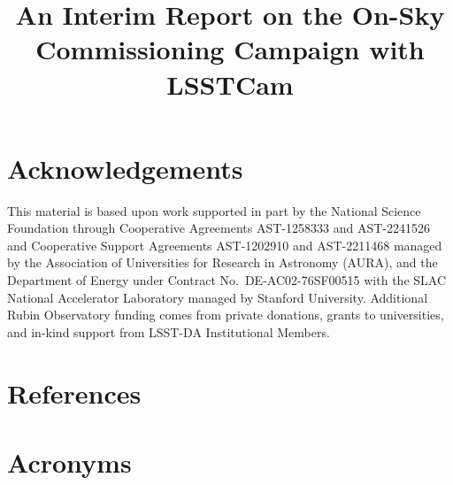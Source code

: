 \documentclass[SE,lsstdraft,authoryear,toc]{lsstdoc}
\title{An Interim Report on the On-Sky Commissioning Campaign with LSSTCam}
\date{\vcsDate}
\begin{document}
\maketitle




\appendix

\section{Acknowledgements}

This material is based upon work supported in part by the National Science Foundation through Cooperative Agreements AST-1258333 and AST-2241526 and Cooperative Support Agreements AST-1202910 and AST-2211468 managed by the Association of Universities for Research in Astronomy (AURA), and the Department of Energy under Contract No.\ DE-AC02-76SF00515 with the SLAC National Accelerator Laboratory managed by Stanford University.
Additional Rubin Observatory funding comes from private donations, grants to universities, and in-kind support from LSST-DA Institutional Members.

\section{References} \label{sec:bib}
\renewcommand{\refname}{} %


\section{Acronyms} \label{sec:acronyms}

\end{document}

